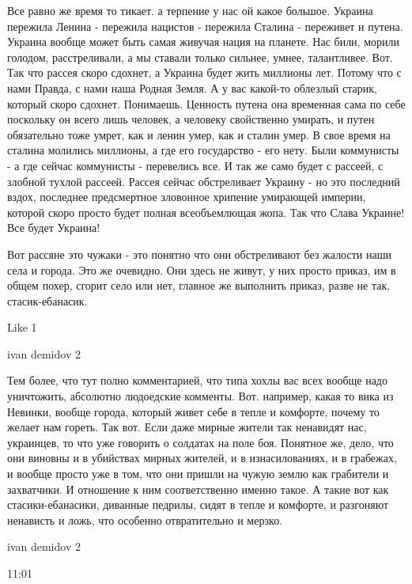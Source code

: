 Все равно же время то тикает. а терпение у нас ой какое большое. Украина
пережила Ленина - пережила нацистов - пережила Сталина - переживет и путена.
Украина вообще может быть самая живучая нация на планете. Нас били, морили
голодом, расстреливали, а мы ставали только сильнее, умнее, талантливее. Вот.
Так что рассея скоро сдохнет, а Украина будет жить миллионы лет. Потому что с
нами Правда, с нами наша Родная Земля. А у вас какой-то облезлый старик,
который скоро сдохнет. Понимаешь. Ценность путена она временная сама по себе
поскольку он всего лишь человек, а человеку свойственно умирать, и путен
обязательно тоже умрет, как и ленин умер, как и сталин умер. В свое время на
сталина молились миллионы, а где его государство - его нету. Были коммунисты -
а где сейчас коммунисты - перевелись все. И так же само будет с рассеей, с
злобной тухлой рассеей. Рассея сейчас обстреливает Украину - но это последний
вздох, последнее предсмертное зловонное хрипение умирающей империи, которой
скоро просто будет полная всеобъемлющая жопа. Так что Слава Украине! Все будет
Украина!

Вот рассяне это чужаки - это понятно что они обстреливают без жалости наши села и города. Это же очевидно. Они здесь не живут, у них просто приказ, им в общем похер, сгорит село или нет, главное же выполнить приказ, разве не так, стасик-ебанасик.

    Like 1

ivan demidov 2

Тем более, что тут полно комментарией, что типа хохлы вас всех вообще надо
уничтожить, абсолютно людоедские комменты. Вот. например, какая то вика из
Невинки, вообще города, который живет себе в тепле и комфорте, почему то желает
нам гореть. Так вот. Если даже мирные жители так ненавидят нас, украинцев, то
что уже говорить о солдатах на поле боя. Понятное же, дело, что они виновны и в
убийствах мирных жителей, и в изнасилованиях, и в грабежах, и вообще просто уже
в том, что они пришли на чужую землю как грабители и захватчики. И отношение к
ним соответственно именно такое. А такие вот как стасики-ебанасики, диванные
педрилы, сидят в тепле и комфорте, и разгоняют ненависть и ложь, что особенно
отвратительно и мерзко.

ivan demidov 2

11:01

